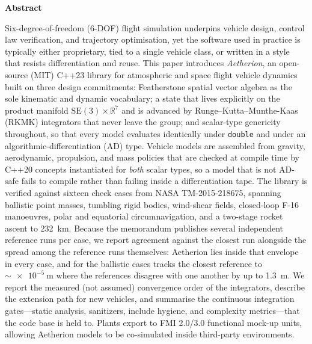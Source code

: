 \documentclass[a4paper,10pt]{article}
\newcommand{\SE}{\mathrm{SE}(3)}
\newcommand{\R}{\mathbb{R}}
\newcommand{\code}[1]{\texttt{\small #1}}
\theoremstyle{definition}
\begin{document}
\begin{center}
  \begin{minipage}{0.92\linewidth}
    \small\textbf{Abstract}

    Six-degree-of-freedom (6-DOF) flight simulation underpins vehicle design,
    control law verification, and trajectory optimisation, yet the software
    used in practice is typically either proprietary, tied to a single vehicle
    class, or written in a style that resists differentiation and reuse.  This
    paper introduces \emph{Aetherion}, an open-source (MIT) C++23 library for
    atmospheric and space flight vehicle dynamics built on three design
    commitments: Featherstone spatial vector algebra as the sole kinematic and
    dynamic vocabulary; a state that lives explicitly on the product manifold
    $\SE \times \R^{7}$ and is advanced by Runge--Kutta--Munthe-Kaas (RKMK)
    integrators that never leave the group; and scalar-type genericity
    throughout, so that every model evaluates identically under
    \code{double} and under an algorithmic-differentiation (AD) type.  Vehicle
    models are assembled from gravity, aerodynamic, propulsion, and mass
    policies that are checked at compile time by C++20 concepts instantiated
    for \emph{both} scalar types, so a model that is not AD-safe fails to
    compile rather than failing inside a differentiation tape.  The library is
    verified against sixteen check cases from NASA
    TM-2015-218675, spanning ballistic point masses, tumbling rigid bodies,
    wind-shear fields, closed-loop F-16 manoeuvres, polar and equatorial
    circumnavigation, and a two-stage rocket ascent to
    \SI{232}{\kilo\metre}.  Because the memorandum publishes several
    independent reference runs per case, we report agreement against the
    closest run alongside the spread among the reference runs themselves:
    Aetherion lies inside that envelope in every case, and for the ballistic
    cases tracks the closest reference to $\sim\!\SI{e-5}{\metre}$ where the
    references disagree with one another by up to \SI{1.3}{\metre}.  We report
    the measured (not assumed) convergence order of the integrators,
    describe the extension path for new vehicles, and summarise the continuous
    integration gates---static analysis, sanitizers, include hygiene, and
    complexity metrics---that the code base is held to.  Plants export to
    FMI 2.0/3.0 functional mock-up units, allowing Aetherion models to be
    co-simulated inside third-party environments.
  \end{minipage}
\end{center}
\end{document}
